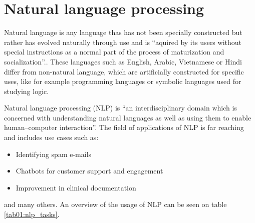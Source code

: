 \chapter{Natural language processing}
Natural language is any language thas has not been specially constructed but rather has evolved naturally through use and is  ``aquired by its users without special instructions as a normal part of the process of maturization and socialization''.\cite{lyons_1991}. These languages such as English, Arabic, Vietnamese or Hindi differ from non-natural language, which are artificially constructed for specific uses, like for example programming languages or symbolic languages used for studying logic.

Natural language processing (NLP) is ``an interdisciplinary domain which is concerned with understanding natural languages as well as using them to enable human–computer interaction''.\cite{nlp_definition} The field of applications of NLP is far reaching and includes use cases such as:
\begin{itemize}
\item Identifying spam e-mails\cite{nlp_tasks}
\item Chatbots for customer support and engagement\cite{nlp_uc_b}
\item Improvement in clinical documentation\cite{nlp_uc_h}	
\end{itemize}
and many others. An overview of the usage of NLP can be seen on table \ref{tab01:nlp_tasks}.

